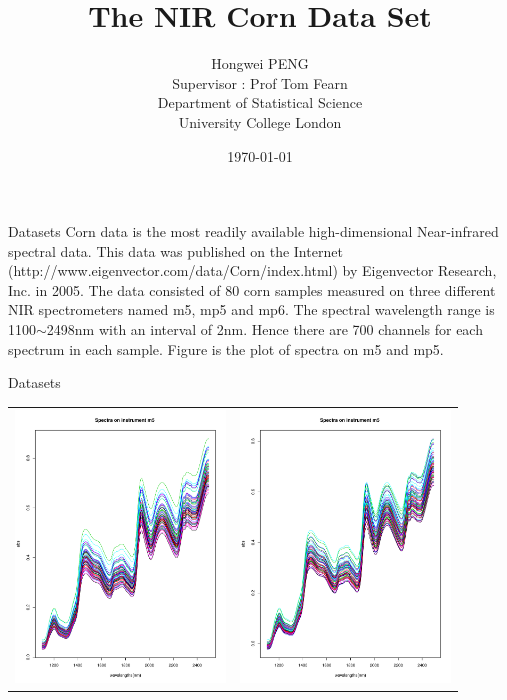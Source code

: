 \documentclass{beamer}             %
\title{\bf The NIR Corn Data Set}
\author{Hongwei PENG \vspace{1cm} \\
	Supervisor : Prof Tom Fearn\\
	Department of Statistical Science \\
	University College London}
\institute{Department of Statistical Science}
\date{\today}
\begin{document}
	
	
\begin{frame}
	\titlepage
\end{frame}	
	
	\begin{frame}{Datasets}
	Corn data is the most readily available high-dimensional Near-infrared spectral data. This data was published on the Internet (http://www.eigenvector.com/data/Corn/index.html) by Eigenvector Research, Inc. in 2005. The data consisted of 80 corn samples measured on three different NIR spectrometers named m5, mp5 and mp6. The spectral wavelength range is 1100$\sim$2498nm with an interval of 2nm. Hence there are 700 channels for each spectrum in each sample. Figure is the plot of spectra on m5 and mp5.
\end{frame}

	
\begin{frame}{Datasets}
	
	\begin{tabular}{cc}
		\begin{minipage}{2in}
			\includegraphics[width=2.2in]{Spectra_on_instrument_m5.pdf}
		\end{minipage}
		&
		\begin{minipage}{2in}
			\includegraphics[width=2.2in]{Spectra_on_instrument_mp5.pdf}
		\end{minipage}
	\end{tabular}
\end{frame}
\end{document}
